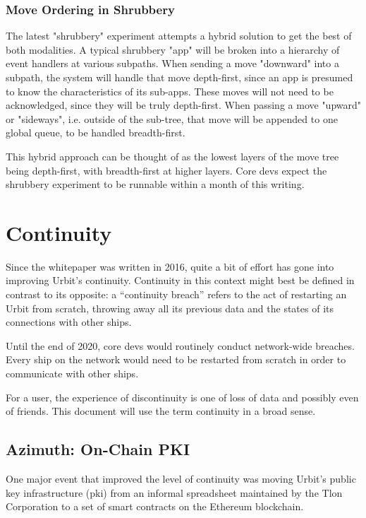 \documentclass[twoside]{article}
\begin{document}
\subsubsection{Move Ordering in Shrubbery}

The latest "shrubbery" experiment attempts a hybrid solution to get the best of both modalities.  A typical shrubbery "app" will be broken into a hierarchy of event handlers at various subpaths.  When sending a move "downward" into a subpath, the system will handle that move depth-first, since an app is presumed to know the characteristics of its sub-apps.  These moves will not need to be acknowledged, since they will be truly depth-first.  When passing a move "upward" or "sideways", i.e. outside of the sub-tree, that move will be appended to one global queue, to be handled breadth-first.

This hybrid approach can be thought of as the lowest layers of the move tree being depth-first, with breadth-first at higher layers.  Core devs expect the shrubbery experiment to be runnable within a month of this writing.

\section{Continuity}

Since the whitepaper was written in 2016, quite a bit of effort has gone into improving Urbit's continuity.  Continuity in this context might best be defined in contrast to its opposite: a ``continuity breach'' refers to the act of restarting an Urbit from scratch, throwing away all its previous data and the states of its connections with other ships.

Until the end of 2020, core devs would routinely conduct network-wide breaches.  Every ship on the network would need to be restarted from scratch in order to communicate with other ships.

For a user, the experience of discontinuity is one of loss of data and possibly even of friends.  This document will use the term continuity in a broad sense.

\subsection{Azimuth: On-Chain PKI}

One major event that improved the level of continuity was moving Urbit's public key infrastructure ({\sc pki}) from an informal spreadsheet maintained by the Tlon Corporation to a set of smart contracts on the Ethereum blockchain.
\end{document}
